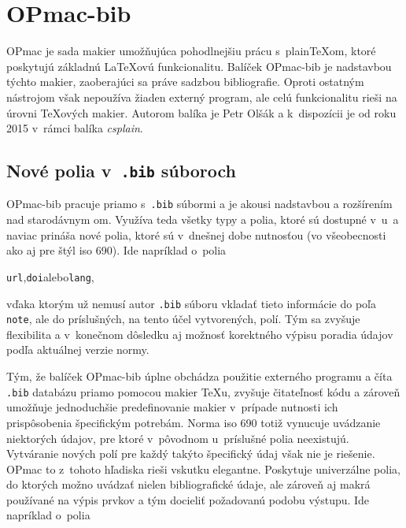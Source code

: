 \documentclass[
  color,
  table,
  nolof,
  oneside,
]{fithesis3}
\begin{document}

\section{OPmac-bib}

OPmac je sada makier umožňujúca pohodlnejšiu prácu s~plain\TeX om, ktoré poskytujú základnú \LaTeX ovú funkcionalitu. Balíček OPmac-bib je nadstavbou týchto makier, zaoberajúci sa práve sadzbou bibliografie. Oproti ostatným nástrojom však nepoužíva žiaden externý program, ale celú funkcionalitu rieši na úrovni \TeX ových makier. Autorom balíka je Petr Olšák a k~dispozícii je od roku 2015 v~rámci balíka \textit{csplain}.

\subsection{Nové polia v~\texttt{.bib} súboroch}

OPmac-bib pracuje priamo s~\texttt{.bib} súbormi a je akousi nadstavbou a rozšírením nad starodávnym \BibTeX om. Využíva teda všetky typy a polia, ktoré sú dostupné v~\BibTeX u~a naviac prináša nové polia, ktoré sú v~dnešnej dobe nutnosťou (vo všeobecnosti ako aj pre štýl \gls{iso} 690). Ide napríklad o~polia

\begin{center}
\texttt{url},\enspace \texttt{doi}\enspace alebo\enspace \texttt{lang},
\end{center}

\noindent vďaka ktorým už nemusí autor \texttt{.bib} súboru vkladať tieto informácie do poľa \texttt{note}, ale do príslušných, na tento účel vytvorených, polí. Tým sa zvyšuje flexibilita a v~konečnom dôsledku aj možnosť korektného výpisu poradia údajov podľa aktuálnej verzie normy.

Tým, že balíček OPmac-bib úplne obchádza použitie externého programu a číta \texttt{.bib} databázu priamo pomocou makier \TeX u, zvyšuje čitateľnosť kódu a zároveň umožňuje jednoduchšie predefinovanie makier v~prípade nutnosti ich prispôsobenia špecifickým potrebám. Norma \gls{iso} 690 totiž vynucuje uvádzanie niektorých údajov, pre ktoré v~pôvodnom \BibTeX u~príslušné polia neexistujú. Vytváranie nových polí pre každý takýto špecifický údaj však nie je riešenie. OPmac to z~tohoto hľadiska rieši vskutku elegantne. Poskytuje univerzálne polia, do ktorých možno uvádzať nielen bibliografické údaje, ale zároveň aj makrá používané na výpis prvkov a tým docieliť požadovanú podobu výstupu. Ide napríklad o~polia
\end{document}
